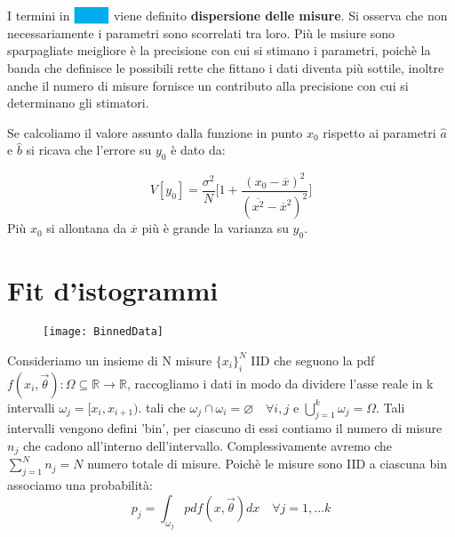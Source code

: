 I termini in $\colorbox{cyan}{\phantom{b = \,}}$ viene definito \textbf{dispersione delle misure}. Si osserva che non necessariamente i parametri sono scorrelati tra loro. Pi\`{u} le msiure sono sparpagliate meigliore \`{e} la precisione con cui si stimano i parametri, poich\`{e} la banda che definisce le possibili rette che fittano i dati diventa pi\`{u} sottile, inoltre anche il numero di misure fornisce un contributo alla precisione con cui si determinano gli stimatori. \newline

\noindent Se calcoliamo il valore assunto dalla funzione in punto $x_0$ rispetto ai parametri $\hat{a}$ e $\hat{b}$ si ricava che l'errore su $y_0$ \`{e} dato da:

\begin{equation*}
	V[y_0] = \dfrac{\sigma^2}{N} \Big[ 1 + \dfrac{(x_0 - \overline{x})^2}{(\overline{x^2} - \overline{x}^2 )^2} \Big ]
\end{equation*}
Pi\`{u} $x_0$ si allontana da $\overline{x}$ pi\`{u} \`{e} grande la varianza su $y_0$.

\section{Fit d'istogrammi}
\begin{wrapfigure}{l}{0.\textwidth}
\centering
\texttt{[image: BinnedData]}	
\end{wrapfigure}
Consideriamo un insieme di N misure $\{x_{i}\}_i^N$ IID che seguono la pdf $f(x_i,\vec{\theta}): \Omega \subseteq \mathbb{R} \rightarrow \mathbb{R}$, raccogliamo i dati in modo da dividere l'asse reale in k intervalli $\omega_j = [x_i,x_{i+1})$. tali che $\omega_j \cap \omega_i = \varnothing \quad \forall i,j$ e $\bigcup_{j=1}^k \omega_j = \Omega$. Tali intervalli vengono defini 'bin', per ciascuno di essi contiamo il numero di misure $n_j$ che cadono all'interno dell'intervallo. Complessivamente avremo che $\sum_{j=1}^N n_j = N$ numero totale di misure. Poich\`{e} le misure sono IID a ciascuna bin associamo una probabilit\`{a}:
\begin{equation*}
	p_j = \int_{\omega_j}pdf(x,\vec{\theta})dx \quad \forall j =1,...k
\end{equation*} 

